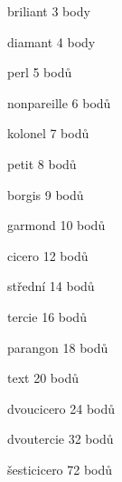 \documentclass{article}
\begin{document}
\fontsize{3pt}{3pt}\selectfont briliant 3 body

\fontsize{4pt}{4pt}\selectfont diamant 4 body

\fontsize{5pt}{6pt}\selectfont perl 5 bodů

\fontsize{6pt}{7pt}\selectfont nonpareille 6 bodů

\fontsize{7pt}{8pt}\selectfont kolonel 7 bodů

\fontsize{8pt}{9pt}\selectfont petit 8 bodů

\fontsize{9pt}{10pt}\selectfont borgis 9 bodů

\fontsize{10pt}{12pt}\selectfont garmond 10 bodů

\fontsize{12pt}{14pt}\selectfont cicero 12 bodů

\fontsize{14pt}{16pt}\selectfont střední 14 bodů

\fontsize{16pt}{19pt}\selectfont tercie 16 bodů

\fontsize{18pt}{21pt}\selectfont parangon 18 bodů

\fontsize{20pt}{24pt}\selectfont text 20 bodů

\fontsize{24pt}{28pt}\selectfont dvoucicero 24 bodů

\fontsize{32pt}{38pt}\selectfont dvoutercie 32 bodů

\fontsize{72pt}{86pt}\selectfont šesticicero 72 bodů
\end{document}
